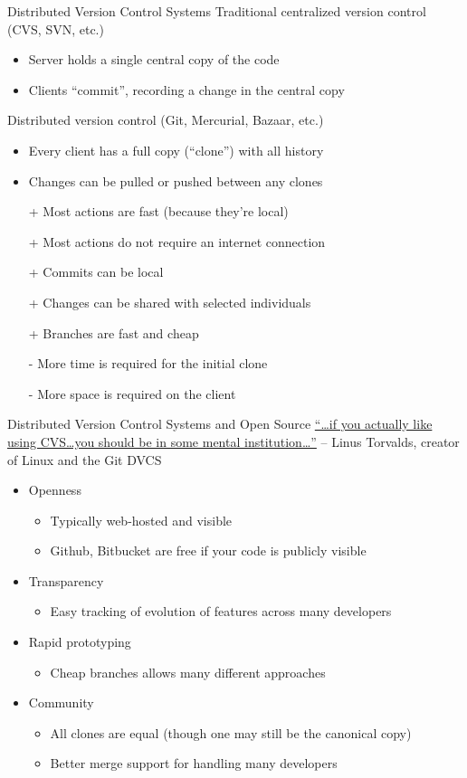 \documentclass{beamer}
\begin{document}
\begin{frame}{Distributed Version Control Systems}
Traditional centralized version control (CVS, SVN, etc.)
\begin{itemize}
\item Server holds a single central copy of the code
\item Clients ``commit'', recording a change in the central copy
\end{itemize}
\medskip
Distributed version control (Git, Mercurial, Bazaar, etc.)
\begin{itemize}
\item Every client has a full copy (``clone'') with all history
\item Changes can be pulled or pushed between any clones
\pause
\item[+] Most actions are fast (because they're local)
\item[+] Most actions do not require an internet connection
\item[+] Commits can be local
\item[+] Changes can be shared with selected individuals
\item[+] Branches are fast and cheap
\item[-] More time is required for the initial clone
\item[-] More space is required on the client
\end{itemize}
\end{frame}

\begin{frame}{Distributed Version Control Systems and Open Source}
\href{http://www.youtube.com/watch?v=4XpnKHJAok8&t=8m30s}{
``\ldots if you actually like using CVS\ldots you should be in some mental institution\ldots''}
\hfill -- Linus Torvalds, creator of Linux and the Git DVCS \\
\bigskip
\begin{itemize}
\item Openness
\begin{itemize}
\item Typically web-hosted and visible
\item Github, Bitbucket are free if your code is publicly visible
\end{itemize}
\item Transparency
\begin{itemize}
\item Easy tracking of evolution of features across many developers
\end{itemize}
\item Rapid prototyping
\begin{itemize}
\item Cheap branches allows many different approaches
\end{itemize}
\item Community
\begin{itemize}
\item All clones are equal (though one may still be the canonical copy)
\item Better merge support for handling many developers
\end{itemize}
\end{itemize}
\end{frame}
\end{document}
